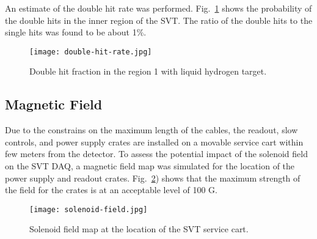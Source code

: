 An estimate of the double hit rate was performed. Fig.~\ref{fig:double-hit-rate} shows the probability of the double hits in the inner region of the SVT. The ratio of the double hits to the single hits was found to be about 1$\%$.

\begin{figure}[hbt] 
\centering 
\texttt{[image: double-hit-rate.jpg]}
\caption{Double hit fraction in the region 1 with liquid hydrogen target.}
\label{fig:double-hit-rate}
\end{figure}

\subsection{Magnetic Field}

Due to the constrains on the maximum length of the cables, the readout, slow controls, and power supply crates are installed on a movable service cart within few meters from the detector. To assess the potential impact of the solenoid field on the SVT DAQ, a magnetic field map was simulated for the location of the power supply and readout crates. Fig.~\ref{fig:solenoid-field}) shows that the maximum strength of the field for the crates is at an acceptable level of 100 G.

\begin{figure}[hbt] 
\centering 
\texttt{[image: solenoid-field.jpg]}
\caption{Solenoid field map at the location of the SVT service cart.}
\label{fig:solenoid-field}
\end{figure}



